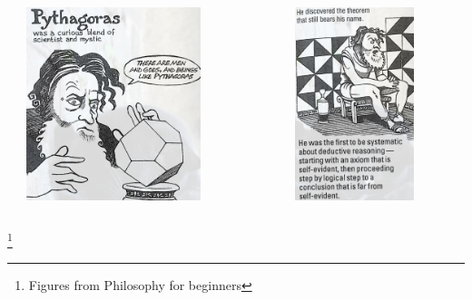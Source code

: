 \documentclass[unicode, 14pt, aspectratio=169]{beamer}
\newcommand\blfootnote[1]{%
  \begingroup
  \renewcommand\thefootnote{}\footnote{#1}%
  \addtocounter{footnote}{-1}%
  \endgroup
}
\begin{document}
\begin{frame}
\begin{columns}
\begin{column}{0.25\textwidth}
\begin{center}
    \end{center}
  \end{column}
  \begin{column}{0.25\textwidth}
    \begin{center}
      \includegraphics[width=0.7\textwidth]{images/pythagoras.png}
    \end{center}
  \end{column}
  \begin{column}{0.25\textwidth}
    \begin{center}
      \includegraphics[width=0.7\textwidth]{images/pythagoras2.png}
    \end{center}
  \end{column}  
\end{columns}
\blfootnote{Figures from Philosophy for beginners\supercite{philosophy-for-begginers}} 
\end{frame}
\end{document}
